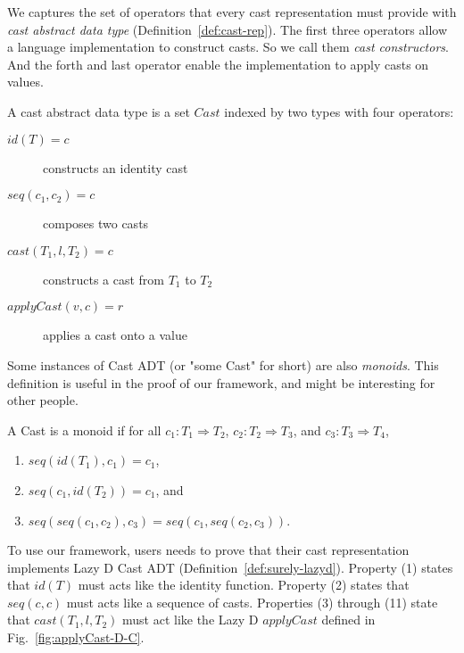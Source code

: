 \documentclass[acmsmall,review,anonymous]{acmart}\settopmatter{printfolios=true,printccs=false,printacmref=false}
\newcommand{\lazyD}{Lazy\;D}
\begin{document}

We captures the set of operators that every cast representation must provide 
with \emph{cast abstract data type} (Definition~\ref{def:cast-rep}). 
The first three operators allow a language implementation to construct casts. 
So we call them \textit{cast constructors}. And the forth and last operator 
enable the implementation to apply casts on values. 

\begin{definition}
	\label{def:cast-rep}
	A cast abstract data type is a set $ Cast $ indexed by two types with
	four operators:
	\begin{description}
		\item[$ id(T) = c $] constructs an identity cast
		\item[$ seq(c_1,c_2)=c $] composes two casts
		\item[$ cast(T_1,l,T_2)=c $] constructs a cast from $ T_1 $ to $ T_2 $
		\item[$ applyCast(v,c)=r $] applies a cast onto a value
	\end{description}
\end{definition}

Some instances of Cast ADT (or "some Cast" for short) are also 
\textit{monoids}. This definition is useful in the proof of 
our framework, and might be interesting for other people.

\begin{definition}[Monoid]
	A Cast is a monoid if 
	for all
	$c_1 : T_1 \Longrightarrow T_2$,
	$c_2 : T_2 \Longrightarrow T_3$, and
	$c_3 : T_3 \Longrightarrow T_4$,
	\begin{enumerate}
		\item $seq(id(T_1),c_1) = c_1$,
		\item $seq(c_1,id(T_2)) = c_1$, and
		\item $seq(seq(c_1, c_2), c_3) = seq(c_1, seq(c_2, c_3))$.
	\end{enumerate}
\end{definition}

To use our framework, users needs to prove that their cast representation
implements Lazy D Cast ADT (Definition~\ref{def:surely-lazyd}). Property (1) 
states that $ id(T) $ must acts like the identity function. Property (2) states 
that $ seq(c,c) $ must acts like a sequence of casts. Properties (3) through 
(11) state that $ cast(T_1,l,T_2) $ must act like the Lazy D $ applyCast $ 
defined in Fig.~\ref{fig:applyCast-D-C}.
\end{document}

